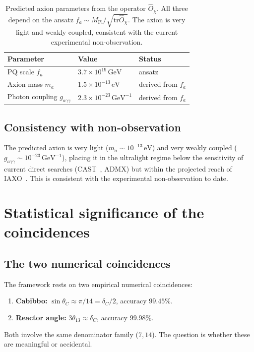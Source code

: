 \documentclass[11pt,a4paper]{article}
\newcommand{\dC}{\delta_C}
\newcommand{\Opchi}{\hat{O}_\chi}
\providecommand{\tr}{}
\renewcommand{\tr}{\mathrm{tr}}
\theoremstyle{plain}
\theoremstyle{definition}
\theoremstyle{remark}
\begin{document}
\begin{table}[h]
\centering
\small
\begin{tabular}{l l l}
\toprule
Parameter & Value & Status \\
\midrule
PQ scale $f_a$        & $3.7 \times 10^{19}\,\mathrm{GeV}$ & ansatz \\
Axion mass $m_a$      & $1.5 \times 10^{-13}\,\mathrm{eV}$  & derived from $f_a$ \\
Photon coupling $g_{a\gamma\gamma}$
                      & $2.3 \times 10^{-23}\,\mathrm{GeV}^{-1}$
                      & derived from $f_a$ \\
\bottomrule
\end{tabular}
\caption{Predicted axion parameters from the operator $\Opchi$.  All
three depend on the ansatz $f_a \sim M_{\mathrm{Pl}}/\sqrt{\tr\Opchi}$.
The axion is very light and weakly coupled, consistent with the
current experimental non-observation.}
\label{tab:axion}
\end{table}

\subsection{Consistency with non-observation}

The predicted axion is very light ($m_a \sim 10^{-13}\,\mathrm{eV}$)
and very weakly coupled ($g_{a\gamma\gamma} \sim 10^{-23}\,
\mathrm{GeV}^{-1}$), placing it in the ultralight regime below the
sensitivity of current direct searches (CAST~\cite{irastorza2018axion},
ADMX) but within the projected reach of IAXO~\cite{adams2022axion}.
This is consistent with the experimental non-observation to date.

\section{Statistical significance of the coincidences}
\label{sec:coincidence-significance}

\subsection{The two numerical coincidences}

The framework rests on two empirical numerical coincidences:
\begin{enumerate}[leftmargin=1.6em,itemsep=1pt]
  \item \textbf{Cabibbo:} $\sin\theta_C \approx \pi/14 = \dC/2$,
        accuracy $99.45\%$.
  \item \textbf{Reactor angle:} $3\theta_{13} \approx \dC$,
        accuracy $99.98\%$.
\end{enumerate}
Both involve the same denominator family ($7, 14$).  The question is
whether these are meaningful or accidental.
\end{document}
